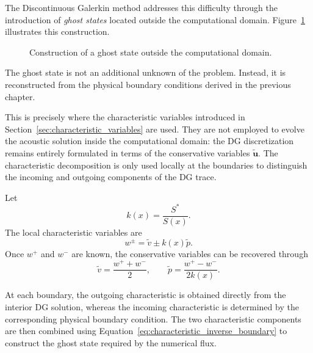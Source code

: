 \documentclass[11pt,a4paper]{report}
\theoremstyle{plain}
\theoremstyle{definition}
\begin{document}
The Discontinuous Galerkin method addresses this difficulty through the
introduction of \emph{ghost states} located outside the computational domain.
Figure~\ref{fig:ghost_cell} illustrates this construction.

\begin{figure}[htbp]
    \centering
    \caption{Construction of a ghost state outside the computational domain.}
    \label{fig:ghost_cell}
\end{figure}

The ghost state is not an additional unknown of the problem. Instead, it is
reconstructed from the physical boundary conditions derived in the previous
chapter.

This is precisely where the characteristic variables introduced in
Section~\ref{sec:characteristic_variables} are used. They are not employed to
evolve the acoustic solution inside the computational domain: the DG
discretization remains entirely formulated in terms of the conservative
variables $\tilde{\mathbf u}$. The characteristic decomposition is only used
locally at the boundaries to distinguish the incoming and outgoing components
of the DG trace.

Let
\begin{equation}
k(x)=\frac{S^\ast}{S(x)}.
\end{equation}
The local characteristic variables are
\begin{equation}
w^\pm
=
\tilde v
\pm
k(x)\tilde p.
\end{equation}
Once $w^+$ and $w^-$ are known, the conservative variables can be recovered
through
\begin{equation}
\boxed{
\tilde v
=
\frac{w^+ + w^-}{2},
\qquad
\tilde p
=
\frac{w^+ - w^-}{2k(x)}.
}
\label{eq:characteristic_inverse_boundary}
\end{equation}

At each boundary, the outgoing characteristic is obtained directly from the
interior DG solution, whereas the incoming characteristic is determined by the
corresponding physical boundary condition. The two characteristic components
are then combined using
Equation~\eqref{eq:characteristic_inverse_boundary} to construct the ghost
state required by the numerical flux.
\end{document}
